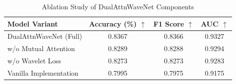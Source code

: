 \documentclass[10pt, conference]{IEEEtran}
\begin{document}
\begin{table}[t]
    \caption{Ablation Study of DualAttnWaveNet Components}
    \label{tab:ablation}
    \centering
    \begin{tabular}{lccc}
        \toprule
        \textbf{Model Variant} & \textbf{Accuracy (\%)} $\uparrow$ & \textbf{F1 Score} $\uparrow$ & \textbf{AUC} $\uparrow$ \\
        \midrule
        DualAttnWaveNet (Full) & 0.8367                            & 0.8366                       & 0.9327                  \\
        \cmidrule{1-4}
        w/o Mutual Attention   & 0.8289                            & 0.8288                       & 0.9294                  \\
        w/o Wavelet Loss       & 0.8273                            & 0.8273                       & 0.9283                  \\
        Vanilla Implementation & 0.7995                            & 0.7975                       & 0.9175                  \\
        \bottomrule
    \end{tabular}
    \vspace{2pt}

\end{table}



\end{document}
